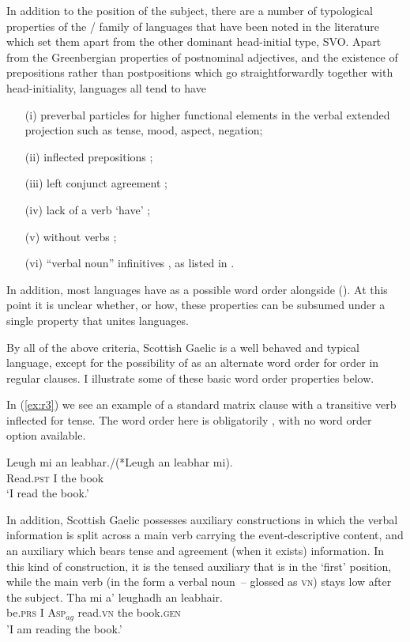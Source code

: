 \documentclass[output=paper,colorlinks,citecolor=brown]{langscibook}
\begin{document}
In addition to the position of the subject, there are a number of typological properties of the / family of languages that have been noted in the literature which set them apart from the other dominant head\hyp initial type, SVO.   Apart from the Greenbergian properties of postnominal adjectives, and the existence of prepositions rather than postpositions which go straightforwardly together with head\hyp initiality,  languages all tend to have 
\begin{enumerate}
\item[(i)] preverbal particles for higher functional elements in the verbal extended projection such as tense, mood, aspect, negation; 
\item[(ii)] inflected prepositions \citep{kayne94as}; 
\item[(iii)] left conjunct agreement \citep{Doron2000}; 
\item[(iv)] lack of a verb `have' \citep{freezegeorgopolous00}; 
\item[(v)]  without verbs \citep{carnie96}; 
\item[(vi)] “verbal noun”  infinitives \citep{Myhill1985}, as listed in \citet{carnieguilfoyle00intro}. 
\end{enumerate}
In addition, most  languages have  as a possible word order alongside  (\citealt{clemenspolinsky13}). At this point it is unclear whether, or how, these properties can be subsumed under a single property that unites  languages.

By all of the above criteria, Scottish Gaelic is a well behaved and typical  language, except for the possibility of  as an alternate word order for  order in regular clauses. I illustrate some of these basic word order properties below. 

In (\ref{ex:r3}) we see an example of a standard matrix clause with a transitive verb inflected for tense.  The word order here is obligatorily , with no  word order option available. 

\ea\label{ex:r3}
\gll Leugh mi an leabhar./(*Leugh an leabhar mi).\\
Read.\textsc{pst} I the book\\
\glt `I read the book.'
\z

In addition, Scottish Gaelic possesses auxiliary constructions in which the verbal information is split across a main verb carrying the event-descriptive content, and an auxiliary which bears tense and agreement (when it exists) information. In this kind of construction, it is the tensed auxiliary that is in the `first' position, while the main verb (in the form a verbal noun~-- glossed as \textsc{vn}) stays low after the subject.
\ea\label{ex:r4}
\gll Tha  mi  a' leughadh  an leabhair. \\
be.\textsc{prs}  I  \textsc{Asp}$_{ag}$ read.\textsc{vn}  the book.\textsc{gen} \\
\glt 'I am reading the book.'
\z
\end{document}
